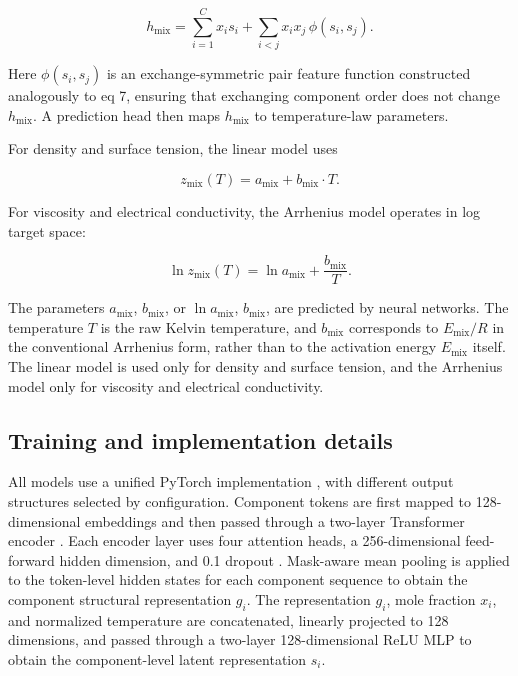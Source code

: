 \documentclass[journal=jctcce,manuscript=article,doi=true]{achemso}
\begin{document}
\[
h_{\mathrm{mix}}
=
\sum_{i=1}^{C}x_i s_i
+
\sum_{i< j}x_i x_j\,
\phi(s_i,s_j).
\tag{10}
\]

\noindent Here \(\phi(s_i,s_j)\) is an exchange-symmetric pair feature function constructed analogously to eq 7, ensuring that exchanging component order does not change \(h_{\mathrm{mix}}\). A prediction head then maps \(h_{\mathrm{mix}}\) to temperature-law parameters.

For density and surface tension, the linear model uses

\[
z_{\mathrm{mix}}(T)=a_{\mathrm{mix}}+b_{\mathrm{mix}}\cdot T.
\tag{11}
\]

For viscosity and electrical conductivity, the Arrhenius model operates in log target space:

\[
\ln z_{\mathrm{mix}}(T)=\ln a_{\mathrm{mix}}+\frac{b_{\mathrm{mix}}}{T}.
\tag{12}
\]

\noindent The parameters \(a_{\mathrm{mix}}\), \(b_{\mathrm{mix}}\), or \(\ln a_{\mathrm{mix}}\), \(b_{\mathrm{mix}}\), are predicted by neural networks. The temperature \(T\) is the raw Kelvin temperature, and \(b_{\mathrm{mix}}\) corresponds to \(E_{\mathrm{mix}}/R\) in the conventional Arrhenius form, rather than to the activation energy \(E_{\mathrm{mix}}\) itself. The linear model is used only for density and surface tension, and the Arrhenius model only for viscosity and electrical conductivity.

\subsection{Training and implementation details}\label{sec:training}

All models use a unified PyTorch implementation \cite{paszke2019pytorch}, with different output structures selected by configuration. Component tokens are first mapped to 128-dimensional embeddings and then passed through a two-layer Transformer encoder \cite{vaswani2017attention}. Each encoder layer uses four attention heads, a 256-dimensional feed-forward hidden dimension, and 0.1 dropout \cite{srivastava2014dropout}. Mask-aware mean pooling is applied to the token-level hidden states for each component sequence to obtain the component structural representation \(g_i\). The representation \(g_i\), mole fraction \(x_i\), and normalized temperature are concatenated, linearly projected to 128 dimensions, and passed through a two-layer 128-dimensional ReLU MLP to obtain the component-level latent representation \(s_i\).
\end{document}

